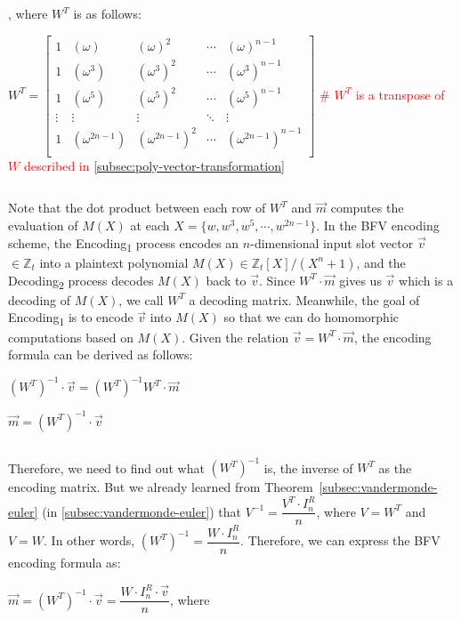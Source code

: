$ $

, where $W^T$ is as follows: 

$W^T = \begin{bmatrix}
1 & (\omega) & (\omega)^2 & \cdots & (\omega)^{n-1}\\
1 & (\omega^3) & (\omega^3)^2 & \cdots & (\omega^3)^{n-1}\\
1 & (\omega^5) & (\omega^5)^2 & \cdots & (\omega^5)^{n-1}\\
\vdots & \vdots & \vdots & \ddots & \vdots \\
1 & (\omega^{2n-1}) & (\omega^{2n-1})^2 & \cdots & (\omega^{2n-1})^{n-1}\\
\end{bmatrix}$  \textcolor{red}{ \text{ } \# $W^T$ is a transpose of $W$ described in \autoref{subsec:poly-vector-transformation}}

$ $

Note that the dot product between each row of $W^T$ and $\vec{m}$ computes the evaluation of $M(X)$ at each $X = \{w, w^3, w^5, \cdots, w^{2n-1}\}$. In the BFV encoding scheme, the \textsf{Encoding\textsubscript{1}} process encodes an $n$-dimensional input slot vector $\vec{v}$ $\in \mathbb{Z}_t$ into a plaintext polynomial $M(X) \in \mathbb{Z}_t[X] / (X^n + 1)$, and the \textsf{Decoding\textsubscript{2}} process decodes $M(X)$ back to $\vec{v}$. Since $W^T \cdot \vec{m}$ gives us $\vec{v}$ which is a decoding of $M(X)$, we call $W^T$ a decoding matrix. Meanwhile, the goal of \textsf{Encoding\textsubscript{1}} is to encode $\vec{v}$ into $M(X)$ so that we can do homomorphic computations based on $M(X)$. Given the relation $\vec{v} = W^T \cdot \vec{m}$, the encoding formula can be derived as follows:

$(W^T)^{-1} \cdot \vec{v} = (W^T)^{-1} W^T \cdot \vec{m}$

$\vec{m} = (W^T)^{-1} \cdot \vec{v}$

$ $

Therefore, we need to find out what $(W^T)^{-1}$ is, the inverse of $W^T$ as the encoding matrix. But we already learned from Theorem~\ref*{subsec:vandermonde-euler} (in \autoref{subsec:vandermonde-euler}) that $V^{-1} = \dfrac{V^T \cdot I_n^R}{n}$, where $V = W^T$ and $V = W$. In other words, $(W^T)^{-1} = \dfrac{W \cdot I_n^R}{n}$. Therefore, we can express the BFV encoding formula as: 

$\vec{m} = (W^T)^{-1} \cdot \vec{v} = \dfrac{W \cdot I_n^R \cdot \vec{v}}{n}$, \text{ } where

$ $

